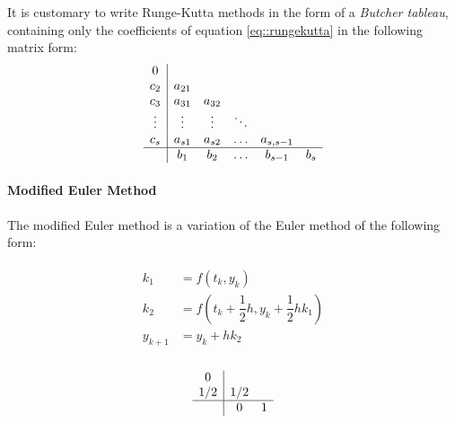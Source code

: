 \begin{definition}
	It is customary to write Runge-Kutta methods in the form of a \textit{Butcher tableau}, containing only the coefficients of equation \ref{eq::rungekutta} in the following matrix form:
	\begin{equation}
		\begin{array}
			{c|ccccc}
			0      &  \\
			c_2    & a_{21} &  \\
			c_3    & a_{31} & a_{32} &  \\
			\vdots & \vdots & \vdots & \ddots &  \\
			c_s    & a_{s1} & a_{s2} & \ldots & a_{s,s-1} &  \\ \hline
			       & b_1    & b_2    & \ldots & b_{s-1}   & b_s
		\end{array}
	\end{equation}
\end{definition}

\paragraph{Modified Euler Method}
The modified Euler method is a variation of the Euler method of the following form:

\begin{minipage}{0.45\textwidth}
	\begin{equation*}
		\begin{split}
		\begin{aligned}
		k_1 &= f(t_k,y_k) \\
		k_2 &= f\left(t_k+\dfrac{1}{2}h,y_k+\dfrac{1}{2}hk_1\right) \\
		y_{k+1} &= y_k + hk_2 \\
		\end{aligned}
		\end{split}
		\label{eq::modified_euler}
	\end{equation*}
\end{minipage}
\begin{minipage}{0.45\textwidth}
	\begin{equation}
		\begin{array}
		{c|cc}
		0      &  \\
		1/2    & 1/2 &  \\ \hline
		& 0    & 1 
		\end{array}
	\end{equation}
\end{minipage}

